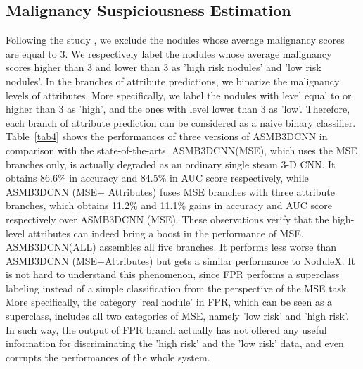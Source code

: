 \documentclass{article}
\begin{document}
\subsection{Malignancy Suspiciousness Estimation}
\label{MSE}
\vspace{-0.2cm}
Following the study \cite{Shen2017Multi}\cite{Causey2018Highly}, we exclude the nodules whose average malignancy scores are equal to 3. We respectively label the nodules whose average malignancy scores higher than 3 and lower than 3 as 'high risk nodules' and 'low risk nodules'.
In the branches of attribute predictions, we binarize the malignancy levels of attributes. More specifically, we label the nodules with level equal to or higher than 3 as 'high', and the ones with level lower than 3 as 'low'. Therefore, each branch of attribute prediction can be considered as a naive binary classifier.
Table~\ref{tab4} shows the performances of three versions of ASMB3DCNN in comparison with the state-of-the-arts. ASMB3DCNN(MSE), which uses the MSE branches only, is actually degraded as an ordinary single steam 3-D CNN. It obtains 86.6\% in accuracy and 84.5\% in AUC score respectively, while ASMB3DCNN (MSE+ Attributes) fuses MSE branches with three attribute branches, which obtains 11.2\% and 11.1\% gains in accuracy and AUC score respectively over ASMB3DCNN (MSE). These observations verify that the high-level attributes can indeed bring a boost in the performance of MSE. ASMB3DCNN(ALL) assembles all five branches. It performs less worse than ASMB3DCNN (MSE+Attributes) but gets a similar performance to NoduleX. It is not hard to understand this phenomenon, since FPR performs a superclass labeling instead of a simple classification from the perspective of the MSE task.  More specifically, the category 'real nodule' in FPR, which can be seen as a superclass, includes all two categories of MSE, namely 'low risk' and 'high risk'. In such way, the output of FPR branch actually has not offered any useful information for discriminating the 'high risk' and the 'low risk' data, and even corrupts the performances of the whole system.

\vspace{-0.5cm}
\end{document}
